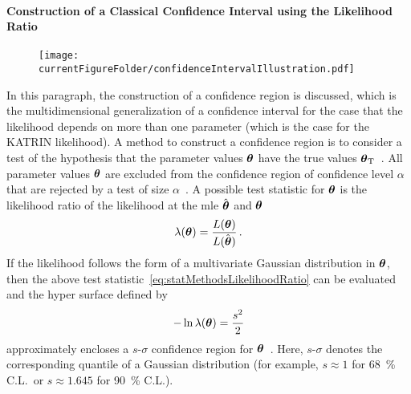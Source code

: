\paragraph{Construction of a Classical Confidence Interval using the Likelihood Ratio}
\begin{figure}
	\centering
	\texttt{[image: \\currentFigureFolder/confidenceIntervalIllustration.pdf]}
	\label{fig:statMethodsConfidenceContour}
\end{figure}
In this paragraph, the construction of a confidence region is discussed, which is the multidimensional generalization of a confidence interval for the case that the likelihood depends on more than one parameter (which is the case for the KATRIN likelihood). A method to construct a confidence region is to consider a test of the hypothesis that the parameter values $\boldsymbol{\mathbf{\theta}}$ have the true values $\boldsymbol{\mathbf{\theta}}_\mathrm{T}$~\cite{ReviewOfParticlePhysics}. All parameter values $\boldsymbol{\mathbf{\theta}}$ are excluded from the confidence region of confidence level $\alpha$ that are rejected by a test of size $\alpha$~\cite{ReviewOfParticlePhysics}. A possible test statistic for $\boldsymbol{\mathbf{\theta}}$ is the likelihood ratio of the likelihood at the \gls{mle} $\hat{\boldsymbol{\mathbf{\theta}}}$ and $\boldsymbol{\mathbf{\theta}}$~\cite{ReviewOfParticlePhysics}
\begin{equation}
	\label{eq:statMethodsLikelihoodRatio}
	\lambda(\boldsymbol{\mathbf{\theta}}) =
	\frac{L(\boldsymbol{\mathbf{\theta}})}{L(\hat{\boldsymbol{\mathbf{\theta}}})}
	\text{\,.}
\end{equation}
If the likelihood follows the form of a multivariate Gaussian distribution in $\boldsymbol{\mathbf{\theta}}$, then the above test statistic~\eqref{eq:statMethodsLikelihoodRatio} can be evaluated and the hyper surface defined by
\begin{equation}
	\label{eq:statMethodsConfidenceContour}
	-\ln \lambda(\boldsymbol{\mathbf{\theta}}) = \frac{s^2}{2}
\end{equation}
approximately encloses a $s$-$\sigma$ confidence region for $\boldsymbol{\mathbf{\theta}}$~\cite{ReviewOfParticlePhysics}. Here, $s$-$\sigma$ denotes the corresponding quantile of a Gaussian distribution (for example, $s\approx1$ for \SI{68}{\percent} C.L.~or $s\approx1.645$ for \SI{90}{\percent} C.L.). 

